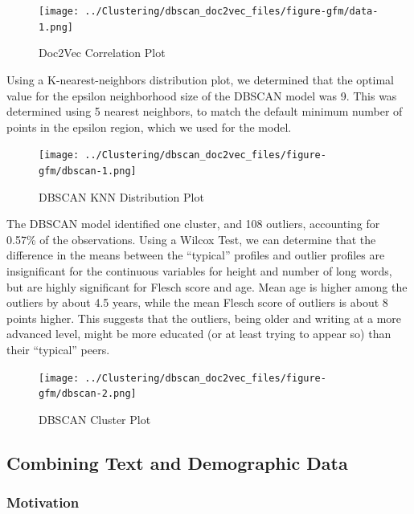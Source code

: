 \documentclass[]{article}
\begin{document}
\begin{figure}
\centering
\texttt{[image: ../Clustering/dbscan\_doc2vec\_files/figure-gfm/data-1.png]}
\caption{Doc2Vec Correlation Plot}
\end{figure}

Using a K-nearest-neighbors distribution plot, we determined that the
optimal value for the epsilon neighborhood size of the DBSCAN model was
9. This was determined using 5 nearest neighbors, to match the default
minimum number of points in the epsilon region, which we used for the
model.

\begin{figure}
\centering
\texttt{[image: ../Clustering/dbscan\_doc2vec\_files/figure-gfm/dbscan-1.png]}
\caption{DBSCAN KNN Distribution Plot}
\end{figure}

The DBSCAN model identified one cluster, and 108 outliers, accounting
for 0.57\% of the observations. Using a Wilcox Test, we can determine
that the difference in the means between the ``typical'' profiles and
outlier profiles are insignificant for the continuous variables for
height and number of long words, but are highly significant for Flesch
score and age. Mean age is higher among the outliers by about 4.5 years,
while the mean Flesch score of outliers is about 8 points higher. This
suggests that the outliers, being older and writing at a more advanced
level, might be more educated (or at least trying to appear so) than
their ``typical'' peers.

\begin{figure}
\centering
\texttt{[image: ../Clustering/dbscan\_doc2vec\_files/figure-gfm/dbscan-2.png]}
\caption{DBSCAN Cluster Plot}
\end{figure}

\hypertarget{combining-text-and-demographic-data}{%
\subsection{Combining Text and Demographic
Data}\label{combining-text-and-demographic-data}}

\hypertarget{motivation}{%
\subsubsection{Motivation}\label{motivation}}
\end{document}
